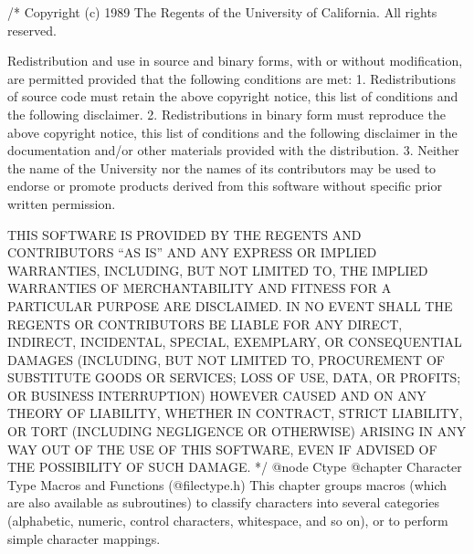 /*
Copyright (c) 1989 The Regents of the University of California.
All rights reserved.

Redistribution and use in source and binary forms, with or without
modification, are permitted provided that the following conditions
are met:
1. Redistributions of source code must retain the above copyright
notice, this list of conditions and the following disclaimer.
2. Redistributions in binary form must reproduce the above copyright
notice, this list of conditions and the following disclaimer in the
documentation and/or other materials provided with the distribution.
3. Neither the name of the University nor the names of its contributors
may be used to endorse or promote products derived from this software
without specific prior written permission.

THIS SOFTWARE IS PROVIDED BY THE REGENTS AND CONTRIBUTORS ``AS IS'' AND
ANY EXPRESS OR IMPLIED WARRANTIES, INCLUDING, BUT NOT LIMITED TO, THE
IMPLIED WARRANTIES OF MERCHANTABILITY AND FITNESS FOR A PARTICULAR PURPOSE
ARE DISCLAIMED.  IN NO EVENT SHALL THE REGENTS OR CONTRIBUTORS BE LIABLE
FOR ANY DIRECT, INDIRECT, INCIDENTAL, SPECIAL, EXEMPLARY, OR CONSEQUENTIAL
DAMAGES (INCLUDING, BUT NOT LIMITED TO, PROCUREMENT OF SUBSTITUTE GOODS
OR SERVICES; LOSS OF USE, DATA, OR PROFITS; OR BUSINESS INTERRUPTION)
HOWEVER CAUSED AND ON ANY THEORY OF LIABILITY, WHETHER IN CONTRACT, STRICT
LIABILITY, OR TORT (INCLUDING NEGLIGENCE OR OTHERWISE) ARISING IN ANY WAY
OUT OF THE USE OF THIS SOFTWARE, EVEN IF ADVISED OF THE POSSIBILITY OF
SUCH DAMAGE.
 */
@node Ctype
@chapter Character Type Macros and Functions (@file{ctype.h})
This chapter groups macros (which are also available as subroutines)
to classify characters into several categories (alphabetic,
numeric, control characters, whitespace, and so on), or to perform
simple character mappings.

